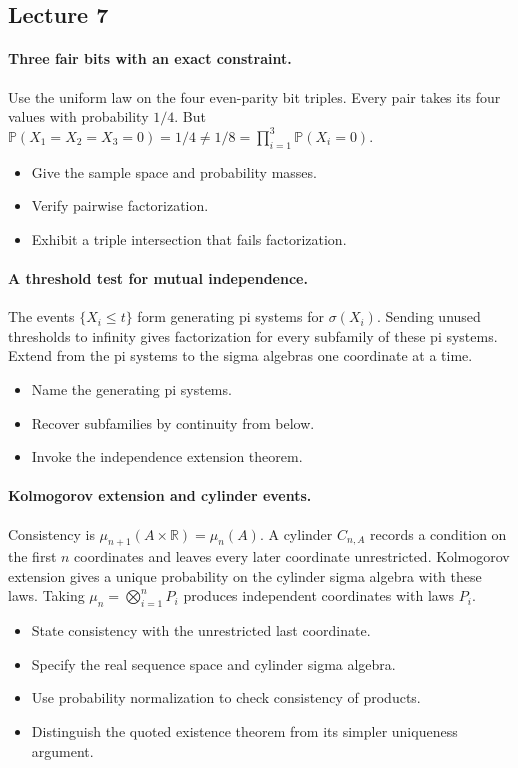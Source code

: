 \documentclass[11pt,letterpaper]{article}
\begin{document}
\subsection{Lecture 7}
\hypertarget{answer-l7-s4}{}\paragraph{Three fair bits with an exact constraint.}
Use the uniform law on the four even-parity bit triples. Every pair takes its four values with probability $1/4$. But $\mathbb P(X_1=X_2=X_3=0)=1/4\ne1/8=\prod_{i=1}^3\mathbb P(X_i=0)$.
\begin{itemize}
\item Give the sample space and probability masses.
\item Verify pairwise factorization.
\item Exhibit a triple intersection that fails factorization.
\end{itemize}
\hypertarget{answer-l7-s7}{}\paragraph{A threshold test for mutual independence.}
The events $\{X_i\le t\}$ form generating pi systems for $\sigma(X_i)$. Sending unused thresholds to infinity gives factorization for every subfamily of these pi systems. Extend from the pi systems to the sigma algebras one coordinate at a time.
\begin{itemize}
\item Name the generating pi systems.
\item Recover subfamilies by continuity from below.
\item Invoke the independence extension theorem.
\end{itemize}
\hypertarget{answer-l7-s13}{}\paragraph{Kolmogorov extension and cylinder events.}
Consistency is $\mu_{n+1}(A\times\mathbb R)=\mu_n(A)$. A cylinder $C_{n,A}$ records a condition on the first $n$ coordinates and leaves every later coordinate unrestricted. Kolmogorov extension gives a unique probability on the cylinder sigma algebra with these laws. Taking $\mu_n=\bigotimes_{i=1}^nP_i$ produces independent coordinates with laws $P_i$.
\begin{itemize}
\item State consistency with the unrestricted last coordinate.
\item Specify the real sequence space and cylinder sigma algebra.
\item Use probability normalization to check consistency of products.
\item Distinguish the quoted existence theorem from its simpler uniqueness argument.
\end{itemize}
\end{document}
